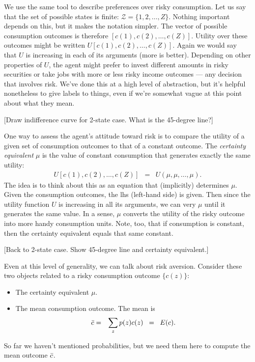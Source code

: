 We use the same tool to describe preferences
over risky consumption.
Let us say that the set of possible states is finite:
$ \mathcal{Z} = \{ 1, 2, \ldots, Z \}$.
Nothing important depends on this, but it makes the notation simpler.
The vector of possible consumption outcomes is therefore
$[c(1), c(2), \ldots, c(Z)]$.
Utility over these outcomes might be written
$U [c(1), c(2), \ldots, c(Z)]$.
Again we would say that $U$ is increasing in each of its arguments
(more is better).
Depending on other properties of $U$,
the agent might prefer to invest different amounts in
risky securities or take jobs with more or less risky income outcomes ---
any decision that involves risk.
We've done this at a high level of abstraction,
but it's helpful nonetheless to give labels to things,
even if we're somewhat vague at this point about what they mean.

[Draw indifference curve for 2-state case. What is the 45-degree line?]

One way to assess the agent's attitude toward risk
is to compare the utility of a given set of consumption outcomes
to that of a constant outcome.
The {\it certainty equivalent\/} $\mu$
is the value of constant consumption
that generates exactly the same utility:
\begin{eqnarray}
    U [c(1), c(2), \ldots, c(Z)]
            &=& U (\mu, \mu, \ldots, \mu ) .
    \label{eq:certequiv-def}
\end{eqnarray}
The idea is to think about this as an equation that (implicitly) determines $\mu$.
Given the consumption outcomes, the lhs (left-hand side) is given.
Then since the utility function $U$ is increasing in all its arguments,
we can very $\mu$ until it generates the same value.
In a sense, $\mu$ converts the utility of the risky outcome
into more handy consumption units.
Note, too, that if consumption is constant, then the certainty
equivalent equals that same constant.

[Back to 2-state case.
Show 45-degree line and certainty equivalent.]

Even at this level of generality, we can talk about risk aversion.
Consider these two objects related to a risky consumption
outcome $\{ c(z)\}$:
%
\begin{itemize}
\item The certainty equivalent $\mu$.

\item The mean consumption outcome.  The mean is
\begin{eqnarray*}
    \bar{c} &=& \sum_z p(z) c(z) \;\;=\;\; E(c) .
\end{eqnarray*}
\end{itemize}
So far we haven't mentioned probabilities, but we need them here to
compute the mean outcome $\bar{c}$.


